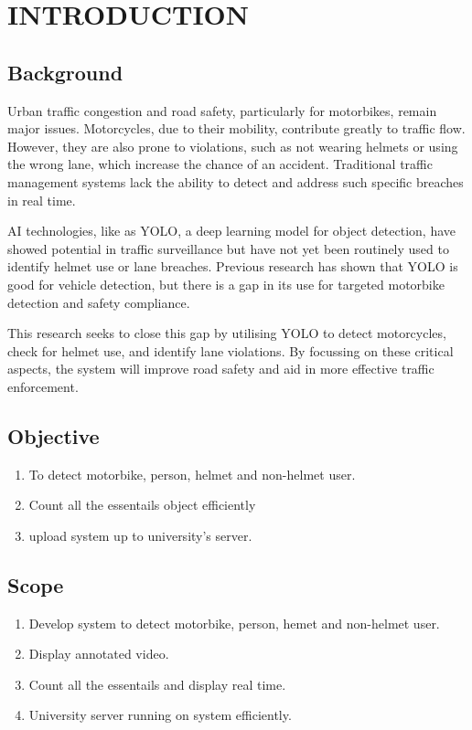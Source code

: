 \chapter{INTRODUCTION}

\section{Background}
Urban traffic congestion and road safety, particularly for motorbikes, remain major issues. Motorcycles, due to their mobility, contribute greatly to traffic flow. However, they are also prone to violations, such as not wearing helmets or using the wrong lane, which increase the chance of an accident. Traditional traffic management systems lack the ability to detect and address such specific breaches in real time.

AI technologies, like as YOLO, a deep learning model for object detection, have showed potential in traffic surveillance but have not yet been routinely used to identify helmet use or lane breaches. Previous research has shown that YOLO is good for vehicle detection, but there is a gap in its use for targeted motorbike detection and safety compliance.

This research seeks to close this gap by utilising YOLO to detect motorcycles, check for helmet use, and identify lane violations. By focussing on these critical aspects, the system will improve road safety and aid in more effective traffic enforcement.

\section{Objective}
\begin{enumerate}
	\item To detect motorbike, person, helmet and non-helmet user.
	\item Count all the essentails object efficiently 
	\item upload system up to university's server.
\end{enumerate}

\section{Scope}
\begin{enumerate}
    \item Develop system to detect motorbike, person, hemet and non-helmet user.
    \item Display annotated video.
    \item  Count all the essentails and display real time.
    \item University server running on system efficiently.
 

\end{enumerate}

